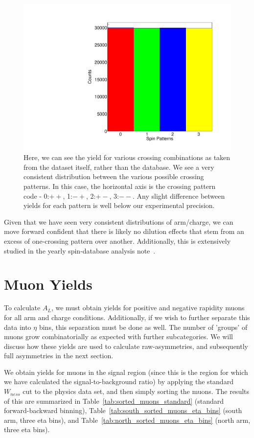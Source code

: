 \begin{figure}
  \centering
  \includegraphics[width=0.6\linewidth]{./figures/crossing_pattenr_count.pdf}
  \caption{
    Here, we can see the yield for various crossing combinations as taken from
    the dataset itself, rather than the database. We see a very consistent
    distribution between the various possible crossing patterns. In this case,
    the horizontal axis is the crossing pattern code - 0:$++$, 1:$-+$, 2:$+-$,
    3:$--$. Any slight difference between yields for each pattern is well below
    our experimental precision.
  }
  \label{fig:polarization_counts}
\end{figure}

Given that we have seen very consistent distributions of arm/charge, we can move
forward confident that there is likely no dilution effects that stem from an
excess of one-crossing pattern over another. Additionally, this is extensively
studied in the yearly spin-database analysis note~\cite{Kim2014}.

\clearpage
\section{Muon Yields}

To calculate $A_L$, we must obtain yields for positive and negative rapidity
muons for all arm and charge conditions. Additionally, if we wish to further
separate this data into $\eta$ bins, this separation must be done as well. The
number of 'groups' of muons grow combinatorially as expected with further
subcategories. We will discuss how these yields are used to calculate
raw-asymmetries, and subsequently full asymmetries in the next section.

We obtain yields for muons in the signal region (since this is the region for
which we have calculated the signal-to-background ratio) by applying the
standard $W_{ness}$ cut to the physics data set, and then simply sorting the
muons. The results of this are summarized in
Table~\ref{tab:sorted_muons_standard} (standard forward-backward binning),
Table~\ref{tab:south_sorted_muons_eta_bins} (south arm, three eta bins), and
Table~\ref{tab:north_sorted_muons_eta_bins} (north arm, three eta bins).

